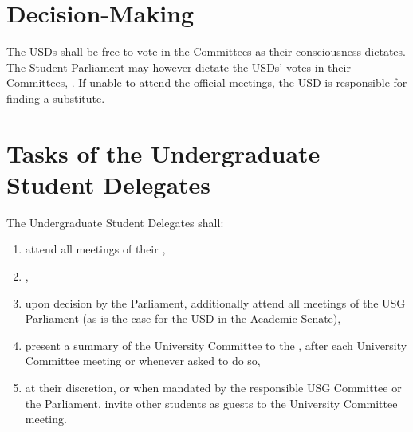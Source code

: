 \section{Decision-Making}
The USDs shall be free to vote in the  Committees as their consciousness dictates. The Student Parliament may however dictate the USDs' votes in their  Committees, . If unable to attend the official meetings, the USD is responsible for finding a substitute.

\section{Tasks of the Undergraduate Student Delegates}
The Undergraduate Student Delegates shall:
\begin{enumerate}
    \item attend all meetings of their ,
    \item {},
    \item upon decision by the Parliament, additionally attend all meetings of the USG Parliament (as is the case for the USD in the Academic Senate),
    \item present a summary of the University Committee to the , after each University Committee meeting or whenever asked to do so,
    \item at their discretion, or when mandated by the responsible USG Committee or the Parliament, invite other students as guests to the University Committee meeting.
\end{enumerate}